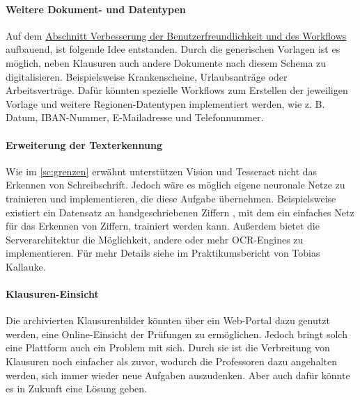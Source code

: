 \documentclass[notables, nomenclature, oneside, 150]{HSMW-Thesis}
\begin{document}
	\paragraph*{Weitere Dokument- und Datentypen} 
		Auf dem \hyperref[pa:benutzer]{Abschnitt Verbesserung der Benutzerfreundlichkeit und des Workflows} \xspace aufbauend, ist folgende Idee entstanden. Durch die generischen Vorlagen ist es möglich, neben Klausuren auch andere Dokumente nach diesem Schema zu digitalisieren. Beispielsweise Krankenscheine, Urlaubsanträge oder Arbeitsverträge. Dafür könnten spezielle Workflows zum Erstellen der jeweiligen Vorlage und weitere Regionen-Datentypen implementiert werden, wie z. B. Datum, IBAN-Nummer, E-Mailadresse und Telefonnummer.
		
	
	\paragraph*{Erweiterung der Texterkennung} 
		Wie im \autoref{sc:grenzen} erwähnt unterstützen Vision und Tesseract nicht das Erkennen von Schreibschrift. Jedoch wäre es möglich eigene neuronale Netze zu trainieren und implementieren, die diese Aufgabe übernehmen. Beispielsweise existiert ein Datensatz an handgeschriebenen Ziffern , mit dem ein einfaches Netz für das Erkennen von Ziffern, trainiert werden kann. Außerdem bietet die Serverarchitektur die Möglichkeit, andere oder mehr OCR-Engines zu implementieren. Für mehr Details siehe im Praktikumsbericht von Tobias Kallauke.
	
	\paragraph*{Klausuren-Einsicht} 
		Die archivierten Klausurenbilder könnten über ein Web-Portal dazu genutzt werden, eine Online-Einsicht der Prüfungen zu ermöglichen. Jedoch bringt solch eine Plattform auch ein Problem mit sich. Durch sie ist die Verbreitung von Klausuren noch einfacher als zuvor, wodurch die Professoren dazu angehalten werden, sich immer wieder neue Aufgaben auszudenken. Aber auch dafür könnte es in Zukunft eine Lösung geben. 
	
\end{document}
